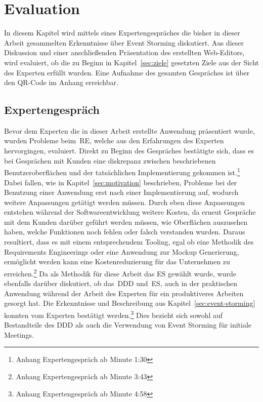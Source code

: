 \chapter{Evaluation}\label{ch:evaluation}
In diesem Kapitel wird mittels eines Expertengespräches die bisher in dieser Arbeit gesammelten Erkenntnisse über Event Storming diskutiert.
Aus dieser Diskussion und einer anschließenden Präsentation des erstellten Web-Editors, wird evaluiert, ob die zu Beginn in Kapitel~\ref{sec:ziele}
gesetzten Ziele aus der Sicht des Experten erfüllt wurden.\newline
Eine Aufnahme des gesamten Gespräches ist über den QR-Code im Anhang erreichbar.

\section{Expertengespräch}\label{sec:expertengespraech}
Bevor dem Experten die in dieser Arbeit erstellte Anwendung präsentiert wurde, wurden Probleme beim~\ac{RE}, welche aus den Erfahrungen des Experten
hervorgingen, evaluiert.
Direkt zu Beginn des Gespräches bestätigte sich, dass es bei Gesprächen mit Kunden eine diskrepanz zwischen beschriebenen Benutzeroberflächen und der
tatsächlichen Implementierung gekommen ist.\footnote{Anhang Expertengespräch ab Minute 1:30}
Dabei fallen, wie in Kapitel~\ref{sec:motivation} beschrieben, Probleme bei der Benutzung einer Anwendung erst nach einer Implementierung auf, wodurch
weitere Anpassungen getätigt werden müssen.
Durch eben diese Anpassungen entstehen während der Softwareentwicklung weitere Kosten, da erneut Gespräche mit dem Kunden darüber geführt werden müssen,
wie Oberflächen auszusehen haben, welche Funktionen noch fehlen oder falsch verstanden wurden.
Daraus resultiert, dass es mit einem entsprechendem Tooling, egal ob eine Methodik des Requirements Engineerings oder eine Anwendung zur Mockup Generierung,
ermöglicht werden kann eine Kostenreduzierung für das Unternehmen zu erreichen.\footnote{Anhang Expertengespräch ab Minute 3:43}\newline
Da als Methodik für diese Arbeit das \ac{ES} gewählt wurde, wurde ebenfalls darüber diskutiert, ob das~\ac{DDD} und~\ac{ES}, auch in der praktischen
Anwendung während der Arbeit des Experten für ein produktiveres Arbeiten gesorgt hat.
Die Erkenntnisse und Beschreibung aus Kapitel~\ref{sec:event-storming} konnten vom Experten bestätigt werden.\footnote{Anhang Expertengespräch ab Minute 4:58}
Dies bezieht sich sowohl auf Bestandteile des \ac{DDD} als auch die Verwendung von Event Storming für initiale Meetings.
